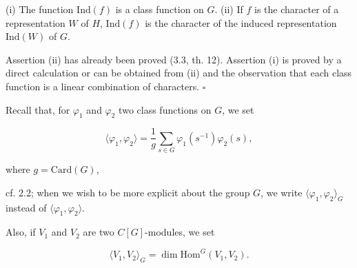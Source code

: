 (i) The function $\text{Ind}(f)$ is a class function on $G$.
(ii) If $f$ is the character of a representation $W$ of $H$, $\text{Ind}(f)$ is the character of the induced representation $\text{Ind}(W)$ of $G$.

Assertion (ii) has already been proved (3.3, th. 12). Assertion (i) is proved by a direct calculation or can be obtained from (ii) and the observation that each class function is a linear combination of characters. $\square$

Recall that, for $\varphi_1$ and $\varphi_2$ two class functions on $G$, we set

$$\langle \varphi_1, \varphi_2 \rangle = \frac{1}{g} \sum_{s \in G} \varphi_1(s^{-1})\varphi_2(s),$$

where $g = \text{Card}(G)$,

cf. 2.2; when we wish to be more explicit about the group $G$, we write $\langle \varphi_1, \varphi_2 \rangle_G$ instead of $\langle \varphi_1, \varphi_2 \rangle$.

Also, if $V_1$ and $V_2$ are two $C[G]$-modules, we set

$$\langle V_1, V_2 \rangle_G = \dim \text{Hom}^G(V_1, V_2).$$
